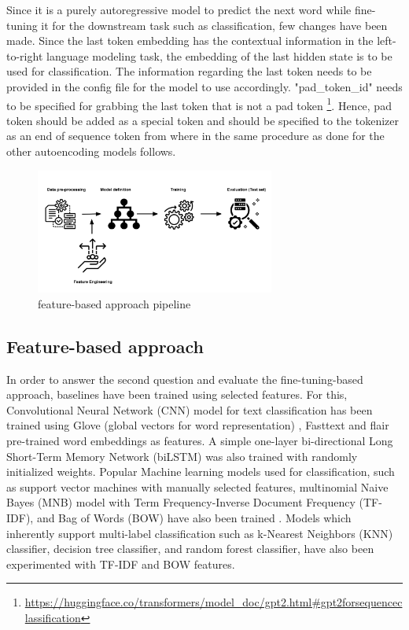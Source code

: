 Since it is a purely autoregressive model to predict the next word while fine-tuning it for the downstream task such as classification, few changes have been made. Since the last token embedding has the contextual information in the left-to-right language modeling task, the embedding of the last hidden state is to be used for classification. The information regarding the last token needs to be provided in the config file for the model to use accordingly. "pad\_token\_id" needs to be specified for grabbing the last token that is not a pad token \footnote{\url{https://huggingface.co/transformers/model_doc/gpt2.html#gpt2forsequenceclassification}}. Hence, pad token should be added as a special token and should be specified to the tokenizer as an end of sequence token from where in the same procedure as done for the other autoencoding models follows.

\begin{figure}[]
    \centering
    \includegraphics[width=0.7\textwidth]{thesis/figures/Baseline_pipeline (2).png}
    \caption{feature-based approach pipeline}
    \label{fig:feature-based approach pipeline}
\end{figure}

\subsection{Feature-based approach}
In order to answer the second question and evaluate the fine-tuning-based approach, baselines have been trained using selected features. For this, Convolutional Neural Network (CNN) model for text classification has been trained using Glove (global vectors for word representation) \cite{pennington2014glove}, Fasttext  \cite{joulin2017bag} and flair  \cite{akbik2019flair} pre-trained word embeddings as features. A simple one-layer bi-directional Long Short-Term Memory Network (biLSTM) was also trained with randomly initialized weights. Popular Machine learning models used for classification, such as support vector machines with manually selected features, multinomial Naive Bayes (MNB) model with Term Frequency-Inverse Document Frequency (TF-IDF), and Bag of Words (BOW) have also been trained \cite{kowsari2019text}. Models which inherently support multi-label classification such as k-Nearest Neighbors (KNN) classifier, decision tree classifier, and random forest classifier, have also been experimented with TF-IDF and BOW features.

